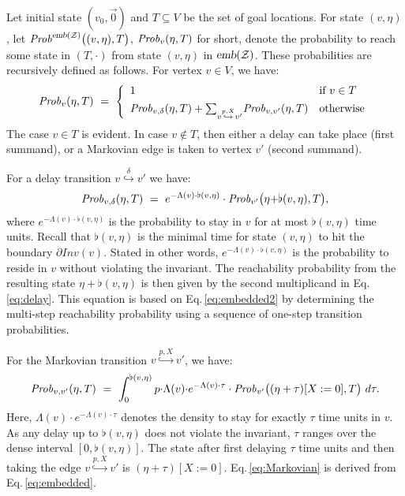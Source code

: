 \documentclass{LMCS}
\newcommand{\mc}[1]{\mathcal{#1}}
\newcommand{\<}{\langle}
\renewcommand{\>}{\rangle}
\newcommand{\emb}{\textsl{emb}}
\newcommand{\Prob}{{\it Prob}}
\newcommand{\Inv}{\mathit{Inv}}
\begin{document}
Let  initial state $(v_0,\vec{0})$ and $T \subseteq V$ be the set of goal locations.
For state $(v,\eta)$, let ${\Prob}^{\emb(\mc{Z})} \big((v,\eta), T \big)$,  ${\Prob}_v(\eta, T)$
for short, denote the probability to reach some state in $(T,\cdot)$ from state $(v,\eta)$ in $\emb(\mc{Z})$.
These probabilities are recursively defined as follows.
For vertex $v \in V$, we have: \begin{equation}\label{eq:basepdp}
\Prob_v(\eta,T) \ = \
\left\{ \begin{array}{ll}
1 & \mbox{if } v \in T \\[1ex]
\Prob_{v,\delta}(\eta,T) +
{\sum}_{v\stackrel{p,X}{\hookrightarrow}v'} \Prob_{v,v'}(\eta,T)
&\mbox{otherwise}
\end{array}\right.
\end{equation}
The case $v \in T$ is evident.  In case $v \not\in T$, then either a delay can
take place (first summand), or a Markovian edge is taken to vertex $v'$ (second
summand).

For a delay transition $v \stackrel{\delta}{\hookrightarrow} v'$ we have:
\begin{equation}\label{eq:delay}
{\Prob}_{v,\delta}(\eta, T) \ = \
   e^{-\Lambda(v){\cdot}\flat(v,\eta)} \cdot {\Prob}_{v'}\big(\eta{+}\flat(v,\eta), T \big),
\end{equation}
where $e^{{-}\Lambda(v){\cdot}\flat(v,\eta)}$ is the probability to stay in $v$ for at most
$\flat(v,\eta)$ time units.  Recall that $\flat(v,\eta)$ is the minimal time for state $(v,\eta)$
to hit the boundary $\partial \Inv(v)$.   Stated in other words, $e^{{-}\Lambda(v){\cdot}
\flat(v,\eta)}$ is the probability to reside in $v$ without violating the invariant.  The reachability
probability from the resulting state $\eta{+}\flat(v,\eta)$ is then given by the second
multiplicand in Eq.\,\eqref{eq:delay}.  This equation is based on Eq.\,\eqref{eq:embedded2}
by determining the multi-step reachability probability using a sequence of one-step
transition probabilities.

For the Markovian transition $v\stackrel{p,X}{\hookrightarrow}v'$, we have:
\begin{equation}\label{eq:Markovian}
{\Prob}_{v, v'} (\eta, T) \ = \
\int_0^{\flat(v,\eta)}p{\cdot}\Lambda(v) {\cdot} e^{{-}\Lambda(v){\cdot}\tau} \cdot
{\Prob}_{v'}\big((\eta+\tau)[X:=0], T\big)\ d\tau.
\end{equation}
Here, $\Lambda(v) {\cdot} e^{{-}\Lambda(v){\cdot}\tau}$ denotes the density to stay
for exactly $\tau$ time units in $v$.  As any delay up to $\flat(v,\eta)$ does not violate
the invariant, $\tau$ ranges over the dense interval $[0, \flat(v,\eta)]$.  The state after
first delaying $\tau$ time units and then taking the edge $v \stackrel{p,X}{\hookrightarrow}
v'$ is $(\eta+\tau)[X:=0]$.
Eq.\,\eqref{eq:Markovian} is derived from Eq.\,\eqref{eq:embedded}.
\end{document}
